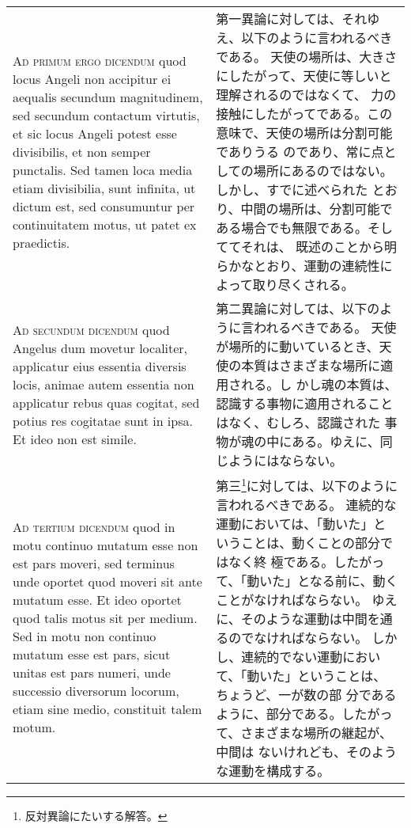 \documentclass[10pt]{jsarticle} %
\begin{document}
\begin{longtable}{p{21em}p{21em}}
\\


{\scshape Ad primum ergo dicendum} quod locus Angeli non
accipitur ei aequalis secundum magnitudinem, sed secundum contactum
virtutis, et sic locus Angeli potest esse divisibilis, et non semper
punctalis. Sed tamen loca media etiam divisibilia, sunt infinita, ut
dictum est, sed consumuntur per continuitatem motus, ut patet ex
praedictis.

&

第一異論に対しては、それゆえ、以下のように言われるべきである。
天使の場所は、大きさにしたがって、天使に等しいと理解されるのではなくて、
 力の接触にしたがってである。この意味で、天使の場所は分割可能でありうる
 のであり、常に点としての場所にあるのではない。しかし、すでに述べられた
 とおり、中間の場所は、分割可能である場合でも無限である。そしててそれは、
 既述のことから明らかなとおり、運動の連続性によって取り尽くされる。

\\


{\scshape Ad secundum dicendum} quod Angelus dum movetur
localiter, applicatur eius essentia diversis locis, animae autem
essentia non applicatur rebus quas cogitat, sed potius res cogitatae
sunt in ipsa. Et ideo non est simile.

&
第二異論に対しては、以下のように言われるべきである。
天使が場所的に動いているとき、天使の本質はさまざまな場所に適用される。し
 かし魂の本質は、認識する事物に適用されることはなく、むしろ、認識された
 事物が魂の中にある。ゆえに、同じようにはならない。

\\


{\scshape Ad tertium dicendum} quod in motu continuo
mutatum esse non est pars moveri, sed terminus unde oportet quod moveri
sit ante mutatum esse. Et ideo oportet quod talis motus sit per
medium. Sed in motu non continuo mutatum esse est pars, sicut unitas est
pars numeri, unde successio diversorum locorum, etiam sine medio,
constituit talem motum.

&

第三\footnote{反対異論にたいする解答。}に対しては、以下のように言われるべきである。
連続的な運動においては、「動いた」ということは、動くことの部分ではなく終
 極である。したがって、「動いた」となる前に、動くことがなければならない。
ゆえに、そのような運動は中間を通るのでなければならない。
しかし、連続的でない運動において、「動いた」ということは、ちょうど、一が数の部
 分であるように、部分である。したがって、さまざまな場所の継起が、中間は
 ないけれども、そのような運動を構成する。


\end{longtable}
\newpage
\end{document}
